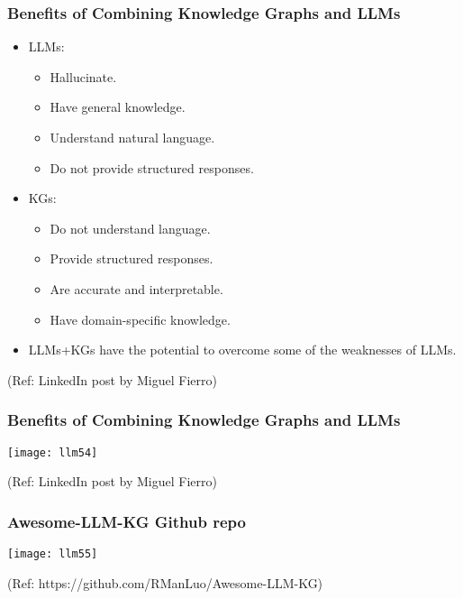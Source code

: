 \begin{frame}[fragile]\frametitle{Benefits of Combining Knowledge Graphs and LLMs}

\begin{itemize}
\item LLMs:
	\begin{itemize}
	\item  Hallucinate.
	\item   Have general knowledge.
	\item   Understand natural language.
	\item   Do not provide structured responses.
	\end{itemize}

\item KGs:
	\begin{itemize}
	\item   Do not understand language.
	\item   Provide structured responses.
	\item   Are accurate and interpretable.
	\item   Have domain-specific knowledge.
	\end{itemize}

\item LLMs+KGs have the potential to overcome some of the weaknesses of LLMs.

\end{itemize}

{\tiny (Ref: LinkedIn post by Miguel Fierro)}


\end{frame}

\begin{frame}[fragile]\frametitle{Benefits of Combining Knowledge Graphs and LLMs}

\begin{center}
\texttt{[image: llm54]}
\end{center}	

{\tiny (Ref: LinkedIn post by Miguel Fierro)}

	
\end{frame}

\begin{frame}[fragile]\frametitle{Awesome-LLM-KG Github repo}

\begin{center}
\texttt{[image: llm55]}
\end{center}	

{\tiny (Ref: https://github.com/RManLuo/Awesome-LLM-KG)}

	
\end{frame}

